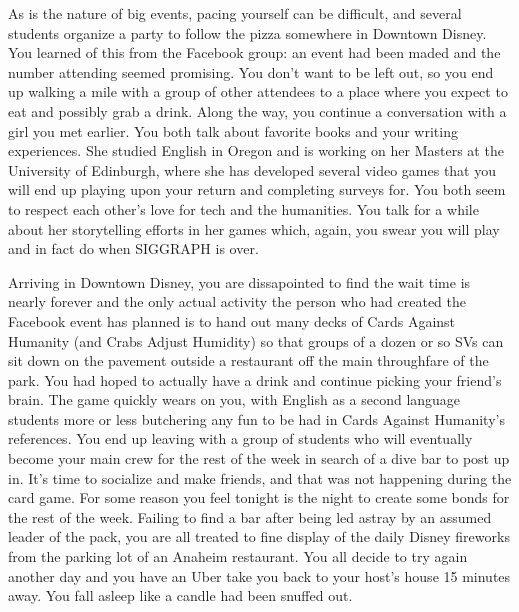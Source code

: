\documentclass[../main.tex]{subfiles}
\begin{document}
As is the nature of big events, pacing yourself can be difficult, and several students organize a party to follow the pizza somewhere in Downtown Disney. You learned of this from the Facebook group: an event had been maded and the number attending seemed promising. You don't want to be left out, so you end up walking a mile with a group of other attendees to a place where you expect to eat and possibly grab a drink. Along the way, you continue a conversation with a girl you met earlier. You both talk about favorite books and your writing experiences. She studied English in Oregon and is working on her Masters at the University of Edinburgh, where she has developed several video games that you will end up playing upon your return and completing surveys for. You both seem to respect each other's love for tech and the humanities. You talk for a while about her storytelling efforts in her games which, again, you swear you will play and in fact do when SIGGRAPH is over.

Arriving in Downtown Disney, you are dissapointed to find the wait time is nearly forever and the only actual activity the person who had created the Facebook event has planned is to hand out many decks of Cards Against Humanity (and Crabs Adjust Humidity) so that groups of a dozen or so SVs can sit down on the pavement outside a restaurant off the main throughfare of the park. You had hoped to actually have a drink and continue picking your friend's brain. The game quickly wears on you, with English as a second language students more or less butchering any fun to be had in Cards Against Humanity's references. You end up leaving with a group of students who will eventually become your main crew for the rest of the week in search of a dive bar to post up in. It's time to socialize and make friends, and that was not happening during the card game. For some reason you feel tonight is the night to create some bonds for the rest of the week. Failing to find a bar after being led astray by an assumed leader of the pack, you are all treated to fine display of the daily Disney fireworks from the parking lot of an Anaheim restaurant. You all decide to try again another day and you have an Uber take you back to your host's house 15 minutes away. You fall asleep like a candle had been snuffed out.
\end{document}
